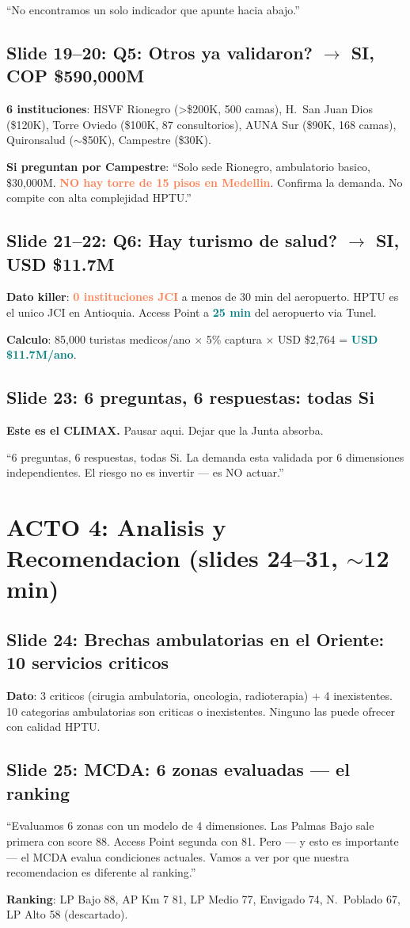 \documentclass[10pt, a4paper]{article}
\newcommand{\hl}[1]{\textcolor{teal}{\textbf{#1}}}
\newcommand{\dg}[1]{\textcolor{coral}{\textbf{#1}}}
\newcommand{\slide}[2]{\subsection{Slide #1: #2}}
\begin{document}
\begin{cita}
``No encontramos un solo indicador que apunte hacia abajo.''
\end{cita}

\slide{19--20}{Q5: Otros ya validaron? $\to$ SI, COP \$590,000M}
\textbf{6 instituciones}: HSVF Rionegro (>\$200K, 500 camas), H.\ San Juan Dios (\$120K), Torre Oviedo (\$100K, 87 consultorios), AUNA Sur (\$90K, 168 camas), Quironsalud ($\sim$\$50K), Campestre (\$30K).

\begin{alerta}
\textbf{Si preguntan por Campestre}: ``Solo sede Rionegro, ambulatorio basico, \$30,000M. \dg{NO hay torre de 15 pisos en Medellin}. Confirma la demanda. No compite con alta complejidad HPTU.''
\end{alerta}

\slide{21--22}{Q6: Hay turismo de salud? $\to$ SI, USD \$11.7M}
\textbf{Dato killer}: \dg{0 instituciones JCI} a menos de 30 min del aeropuerto. HPTU es el unico JCI en Antioquia. Access Point a \hl{25 min} del aeropuerto via Tunel.

\textbf{Calculo}: 85,000 turistas medicos/ano $\times$ 5\% captura $\times$ USD \$2,764 = \hl{USD \$11.7M/ano}.

\slide{23}{6 preguntas, 6 respuestas: todas Si}

\begin{tip}
\textbf{Este es el CLIMAX.} Pausar aqui. Dejar que la Junta absorba.

\vspace{4pt}
``6 preguntas, 6 respuestas, todas Si. La demanda esta validada por 6 dimensiones independientes. El riesgo no es invertir --- es NO actuar.''
\end{tip}

\section{ACTO 4: Analisis y Recomendacion (slides 24--31, $\sim$12 min)}

\slide{24}{Brechas ambulatorias en el Oriente: 10 servicios criticos}
\textbf{Dato}: 3 criticos (cirugia ambulatoria, oncologia, radioterapia) + 4 inexistentes. 10 categorias ambulatorias son criticas o inexistentes. Ninguno las puede ofrecer con calidad HPTU.

\slide{25}{MCDA: 6 zonas evaluadas --- el ranking}
\begin{tip}
``Evaluamos 6 zonas con un modelo de 4 dimensiones. Las Palmas Bajo sale primera con score 88. Access Point segunda con 81. Pero --- y esto es importante --- el MCDA evalua condiciones actuales. Vamos a ver por que nuestra recomendacion es diferente al ranking.''
\end{tip}
\textbf{Ranking}: LP Bajo 88, AP Km 7 81, LP Medio 77, Envigado 74, N.\ Poblado 67, LP Alto 58 (descartado).
\end{document}
